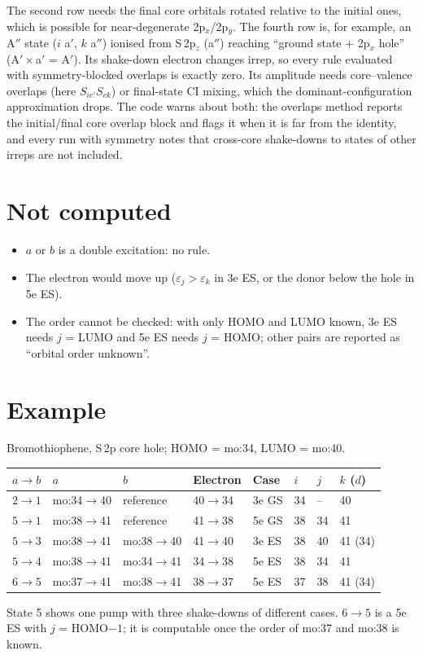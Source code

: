 \documentclass[11pt]{article}
\begin{document}
\noindent The second row needs the final core orbitals rotated relative to the initial ones, which is
possible for near-degenerate 2p$_x$/2p$_y$. The fourth row is, for example, an A$''$ state
($i$ a$'$, $k$ a$''$) ionised from S\,2p$_z$ (a$''$) reaching ``ground state + 2p$_x$ hole''
(A$'\times$a$'$ = A$'$). Its shake-down electron changes irrep, so every rule evaluated with
symmetry-blocked overlaps is exactly zero. Its amplitude needs core--valence overlaps (here
$S_{ic'}S_{ck}$) or final-state CI mixing, which the dominant-configuration approximation drops.
The code warns about both: the overlaps method reports the initial/final core overlap block and
flags it when it is far from the identity, and every run with symmetry notes that cross-core
shake-downs to states of other irreps are not included.

\section{Not computed}

\begin{itemize}\setlength\itemsep{0pt}
\item $a$ or $b$ is a double excitation: no rule.
\item The electron would move up ($\varepsilon_j>\varepsilon_k$ in 3e ES, or the donor below
  the hole in 5e ES).
\item The order cannot be checked: with only HOMO and LUMO known, 3e ES needs $j$ = LUMO
  and 5e ES needs $j$ = HOMO; other pairs are reported as ``orbital order unknown''.
\end{itemize}

\section{Example}

Bromothiophene, S\,2p core hole; HOMO = mo:34, LUMO = mo:40.

\begin{center}
\small
\begin{tabular}{@{}llllllll@{}}
\toprule
$a\to b$ & $a$ & $b$ & Electron & Case & $i$ & $j$ & $k$ ($d$) \\
\midrule
$2\to1$ & mo:34$\to$40 & reference & 40$\to$34 & 3e GS & 34 & -- & 40 \\
$5\to1$ & mo:38$\to$41 & reference & 41$\to$38 & 5e GS & 38 & 34 & 41 \\
$5\to3$ & mo:38$\to$41 & mo:38$\to$40 & 41$\to$40 & 3e ES & 38 & 40 & 41 (34) \\
$5\to4$ & mo:38$\to$41 & mo:34$\to$41 & 34$\to$38 & 5e ES & 38 & 34 & 41 \\
$6\to5$ & mo:37$\to$41 & mo:38$\to$41 & 38$\to$37 & 5e ES & 37 & 38 & 41 (34) \\
\bottomrule
\end{tabular}
\end{center}
State 5 shows one pump with three shake-downs of different cases. $6\to5$ is a 5e ES with
$j$ = HOMO$-1$; it is computable once the order of mo:37 and mo:38 is known.
\end{document}
